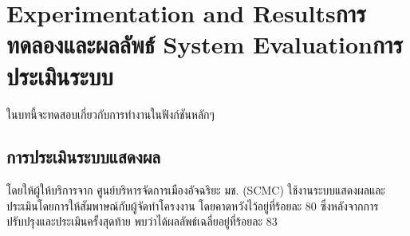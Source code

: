 \chapter{\ifproject%
\ifenglish Experimentation and Results\else การทดลองและผลลัพธ์\fi
\else%
\ifenglish System Evaluation\else การประเมินระบบ\fi
\fi}

ในบทนี้จะทดสอบเกี่ยวกับการทำงานในฟังก์ชันหลักๆ

\section{การประเมินระบบแสดงผล}
โดยให้ผู้ให้บริการจาก ศูนย์บริหารจัดการเมืองอัจฉริยะ มช. (SCMC) ใช้งานระบบแสดงผลและประเมินโดยการให้สัมพาษณ์กับผู้จัดทำโครงงาน โดยคาดหวังไว้อยู่ที่ร้อยละ 80 ซึ่งหลังจากการปรับปรุงและประเมินครั้งสุดท้าย พบว่าได้ผลลัพธ์เฉลี่ยอยู่ที่ร้อยละ 83
